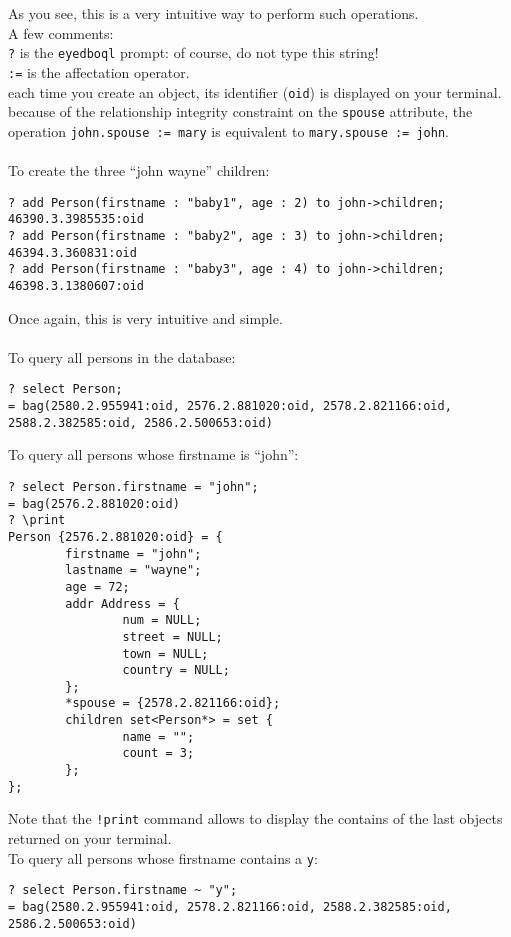 \normalsize
As you see, this is a very intuitive way to perform such operations.
\\
A few comments:\\
\idt \texttt{?} is the \texttt{eyedboql} prompt: of course, do not type
this string!\\
\idt \texttt{:=} is the affectation operator.\\
\idt each time you create an object, its identifier (\texttt{oid}) is displayed
on your terminal.\\
\idt because of the relationship integrity constraint on the \texttt{spouse}
attribute, the operation \texttt{john.spouse := mary} is equivalent to
\texttt{mary.spouse := john}.\\
\\
To create the three ``john wayne'' children:
\verbsize \begin{verbatim}
? add Person(firstname : "baby1", age : 2) to john->children;
46390.3.3985535:oid
? add Person(firstname : "baby2", age : 3) to john->children;
46394.3.360831:oid
? add Person(firstname : "baby3", age : 4) to john->children;
46398.3.1380607:oid
\end{verbatim}
\normalsize
Once again, this is very intuitive and simple.\\
\\
To query all persons in the database:
\verbsize \begin{verbatim}
? select Person;
= bag(2580.2.955941:oid, 2576.2.881020:oid, 2578.2.821166:oid, 2588.2.382585:oid, 2586.2.500653:oid)
\end{verbatim}
\normalsize
To query all persons whose firstname is ``john'':
\verbsize \begin{verbatim}
? select Person.firstname = "john";
= bag(2576.2.881020:oid)
? \print
Person {2576.2.881020:oid} = { 
        firstname = "john";
        lastname = "wayne";
        age = 72;
        addr Address = { 
                num = NULL;
                street = NULL;
                town = NULL;
                country = NULL;
        };
        *spouse = {2578.2.821166:oid};
        children set<Person*> = set { 
                name = "";
                count = 3;
        };
};
\end{verbatim}
\normalsize
Note that the \texttt{!print} command allows to display the contains of the
last objects returned on your terminal.
\\
To query all persons whose firstname contains a \texttt{y}:
\verbsize \begin{verbatim}
? select Person.firstname ~ "y";
= bag(2580.2.955941:oid, 2578.2.821166:oid, 2588.2.382585:oid, 2586.2.500653:oid)
\end{verbatim}
\normalsize


